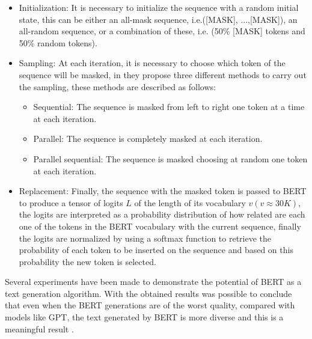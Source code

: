 \documentclass[10pt,twocolumn,letterpaper]{article}
\begin{document}
\begin{itemize}
\item Initialization: It is necessary to initialize the sequence with a random initial state, this can be either an all-mask sequence,
i.e.([MASK], ...,[MASK]), an all-random sequence, or a combination of these, i.e. (50\% [MASK] tokens and 50\% random tokens).
\item Sampling: At each iteration, it is necessary to choose which token of the sequence will be masked, in \cite{wang2019bert}
they propose three different methods to carry out the sampling, these methods are described as follows:
\begin{itemize}
   \item Sequential: The sequence is masked from left to right one token at a time at each iteration.
   \item Parallel: The sequence is completely masked at each iteration.
   \item Parallel sequential: The sequence is masked choosing at random one token at each iteration.
\end{itemize}
\item Replacement: Finally, the sequence with the masked token is passed to BERT to produce a tensor of logits $L$ of
the length of its vocabulary $v (v \approx 30K)$, the logits are interpreted as a probability distribution of how related
are each one of the tokens in the BERT vocabulary with the current sequence, finally the logits are normalized by using a
softmax function to retrieve the probability of each token to be inserted on the sequence and based on this probability
the new token is selected.
\end{itemize}

Several experiments have been made to demonstrate the potential of BERT as a text generation algorithm.
With the obtained results was possible to conclude that even when the BERT generations are of the worst quality,
compared with models like GPT, the text generated by BERT is more diverse and this is a meaningful result \cite{wang2019bert}.
\end{document}
